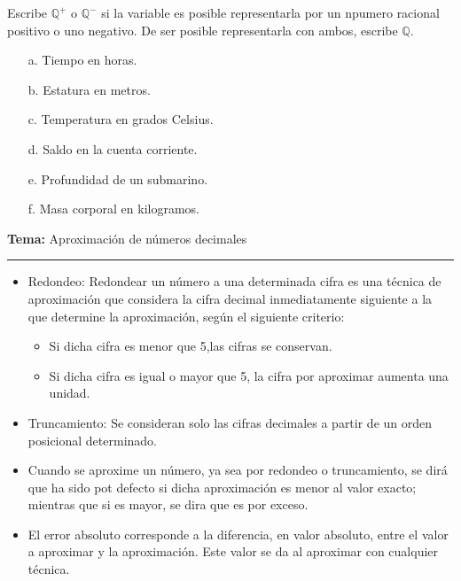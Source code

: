 \documentclass[spanish,letterpaper, 11pt, addpoints, answers]{exam}
\begin{document}
\begin{questions}
  \question Escribe $\mathbb{Q}^+$ o $\mathbb{Q}^-$ si la variable es posible representarla por un npumero racional positivo o uno negativo. De ser posible representarla con ambos, escribe $\mathbb{Q}$.

  \begin{multicols}{2}
    \begin{itemize}
      \item[a.] Tiempo en horas.
      \item[b.] Estatura en metros.
      \item[c.] Temperatura en grados Celsius.
      \item[d.] Saldo en la cuenta corriente.
      \item[e.] Profundidad de un submarino.
      \item[f.] Masa corporal en kilogramos.
    \end{itemize}

  \end{multicols}

  \newpage

  \parbox{6in}{
    \textbf{Tema:} Aproximación de números decimales}
  \vspace{0.15in}
  \hrule

  \begin{itemize}
    \item Redondeo: Redondear un número a una determinada cifra es una técnica de aproximación que considera la cifra decimal inmediatamente siguiente a la que determine la aproximación, según el siguiente criterio:
          \begin{itemize}
            \item Si dicha cifra es menor que 5,las cifras se conservan.
            \item Si dicha cifra es igual o mayor que 5, la cifra por aproximar aumenta una unidad.
          \end{itemize}
    \item Truncamiento: Se consideran solo las cifras decimales a partir de un orden posicional determinado.
    \item Cuando se aproxime un número, ya sea por redondeo o truncamiento, se dirá que ha sido pot defecto si dicha aproximación es menor al valor exacto; mientras que si es mayor, se dira que es por exceso.
    \item El error absoluto corresponde a la diferencia, en valor absoluto, entre el valor a aproximar y la aproximación. Este valor se da al aproximar con cualquier técnica.
  \end{itemize}


\end{questions}
\end{document}
